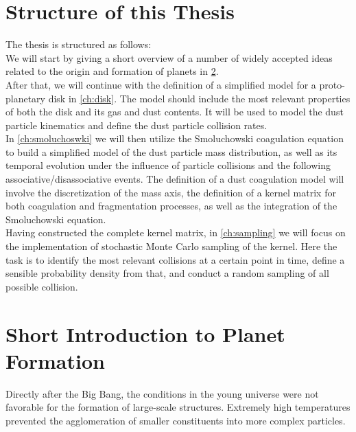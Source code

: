 \section{Structure of this Thesis}

The thesis is structured as follows: \\

We will start by giving a short overview of a number of widely accepted ideas
related to the origin and formation of planets in \cref{sec:prerequisites}. \\

After that, we will continue with the definition of a simplified model for a proto-planetary
disk in \cref{ch:disk}. The model should include the most relevant properties of both the disk and 
its gas and dust contents. It will be used to model the dust particle kinematics and define the dust 
particle collision rates. \\

In \cref{ch:smoluchoswki} we will then utilize the Smoluchowski coagulation equation to build a 
simplified model of the dust particle mass distribution, as well as its temporal evolution under 
the influence of particle collisions and the following associative/disassociative events. 
The definition of a dust coagulation model will involve the discretization of the mass axis, 
the definition of a kernel matrix for both coagulation and fragmentation processes,
as well as the integration of the Smoluchowski equation. \\

Having constructed the complete kernel matrix, in \cref{ch:sampling} we will focus on the 
implementation of stochastic Monte Carlo sampling of the kernel. 
Here the task is to identify the most relevant collisions at a certain point in time,
define a sensible probability density from that, 
and conduct a random sampling of all possible collision.

\section{Short Introduction to Planet Formation}
\label{sec:prerequisites}


    Directly after the Big Bang, the conditions in the young universe were not favorable for the
    formation of large-scale structures. Extremely high temperatures prevented the agglomeration 
    of smaller constituents into more complex particles. \\

